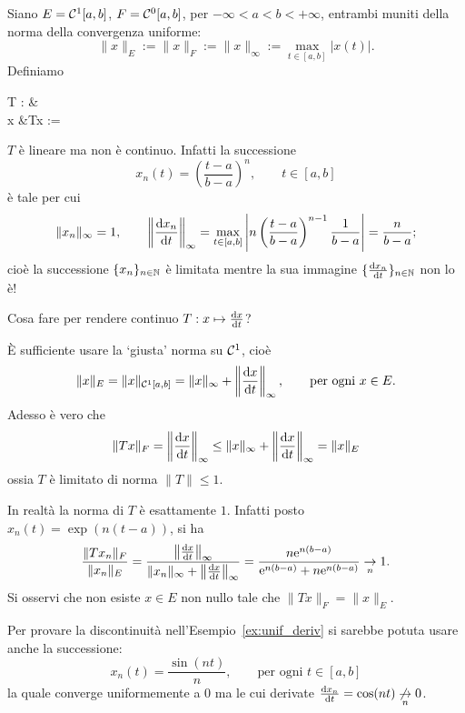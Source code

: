 \begin{example}
\label{ex:unif_deriv}
	Siano $E = \Cone[a,b]$, $F = \Czero[a,b]$, per $-\infty < a < b < +\infty$, entrambi muniti della norma della convergenza uniforme:
	$$
		\|x\|_E := \|x\|_F := \|x\|_\infty := \max_{t \in [a,b]} |x(t)|.
	$$
	Definiamo
	\begin{eqalign}
		T : \Cone[a,b] &\longto \Czero[a,b]\\
		x &\longmapsto Tx := 
	\end{eqalign}
	$T$ è lineare ma non è continuo. Infatti la successione
	$$
		x_n(t) = \left(\frac{t-a}{b-a}\right)^n, \qquad t \in [a,b]
	$$
	è tale per cui
	$$
		\|x_n\|_\infty = 1, \qquad \left\|\der{x_n}{t}\right\|_\infty = \max_{t \in [a,b]} \left| n \left(\frac{t-a}{b-a}\right)^{n-1} \frac1{b-a} \right| = \frac{n}{b-a};
	$$
	cioè la successione $\{x_n\}_{n \in \N}$ è limitata mentre la sua immagine $\{\der{x_n}t\}_{n \in \N}$ non lo è!
\end{example}

\begin{question*}
	Cosa fare per rendere continuo $T : x \mapsto \der{x}{t}$?
\end{question*}

È sufficiente usare la `giusta' norma su $\Cone$, cioè
$$
	\|x\|_E = \|x\|_{\Cone[a,b]} = \|x\|_\infty + \left\|\der{x}{t}\right\|_\infty, \qquad \text{per ogni $x \in E$}.
$$
Adesso è vero che
$$
	\|Tx\|_F = \left\|\der{x}{t}\right\|_\infty \leq \|x\|_\infty + \left\|\der{x}{t}\right\|_\infty = \|x\|_E
$$
ossia $T$ è limitato di norma $\|T\| \leq 1$.

In realtà la norma di $T$ è esattamente $1$. Infatti posto $x_n(t) = \exp(n(t-a))$, si ha
$$
	\frac{\|Tx_n\|_F}{\|x_n\|_E} = \frac{\left\|\der{x}{t}\right\|_\infty}{\|x_n\|_\infty + \left\|\der{x}{t}\right\|_\infty} = \frac{n\e^{n(b-a)}}{\e^{n(b-a)} + n\e^{n(b-a)}} \conv[n] 1.
$$
Si osservi che non esiste $x \in E$ non nullo tale che $\|Tx\|_F = \|x\|_E$.

\begin{remark}
	Per provare la discontinuità nell'Esempio~\ref{ex:unif_deriv} si sarebbe potuta usare anche la successione:
	$$
		x_n(t) = \frac{\sin (nt)}n, \qquad \text{per ogni $t \in [a,b]$}
	$$
	la quale converge uniformemente a $0$ ma le cui derivate $\der{x_n}t = \cos(nt) \not\conv[n] 0$.
\end{remark}


